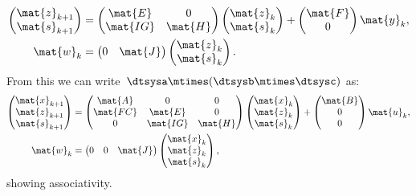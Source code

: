 \begin{definition}
\begin{equation*}
\begin{aligned}
\begin{pmatrix}
			\mat{z}_{k+1} \\
			\mat{s}_{k+1}
		\end{pmatrix} & =
		\begin{pmatrix}
			\mat{E}  & 0       \\
			\mat{IG} & \mat{H}
		\end{pmatrix}\begin{pmatrix}
			\mat{z}_k \\ \mat{s}_k
		\end{pmatrix}+
		\begin{pmatrix}
			\mat{F} \\ 0
		\end{pmatrix}\mat{y}_k,                                                \\
		\mat{w}_k                  & =\begin{pmatrix}
			0 & \mat{J}
		\end{pmatrix}\begin{pmatrix}
			\mat{z}_k \\ \mat{s}_k
		\end{pmatrix}.
	\end{aligned}
\end{equation*}
From this we can write~$\dtsysa\mtimes (\dtsysb\mtimes \dtsysc)$ as:
\begin{equation*}
	\label{eq:dlin-7}
	\begin{aligned}
		\begin{pmatrix}
			\mat{x}_{k+1} \\
			\mat{z}_{k+1} \\
			\mat{s}_{k+1}
		\end{pmatrix} & =
		\begin{pmatrix}
			\mat{A}  & 0        & 0       \\
			\mat{FC} & \mat{E}  & 0       \\
			0        & \mat{IG} & \mat{H}
		\end{pmatrix}\begin{pmatrix}
			\mat{x}_k \\ \mat{z}_k\\ \mat{s}_k
		\end{pmatrix}+
		\begin{pmatrix}
			\mat{B} \\ 0\\ 0
		\end{pmatrix}\mat{u}_k,                                                \\
		\mat{w}_k                  & =\begin{pmatrix}
			0 & 0 & \mat{J}
		\end{pmatrix}\begin{pmatrix}
			\mat{x}_k \\ \mat{z}_k\\ \mat{s}_k
		\end{pmatrix},
	\end{aligned}
\end{equation*}
showing associativity.


\end{definition}
